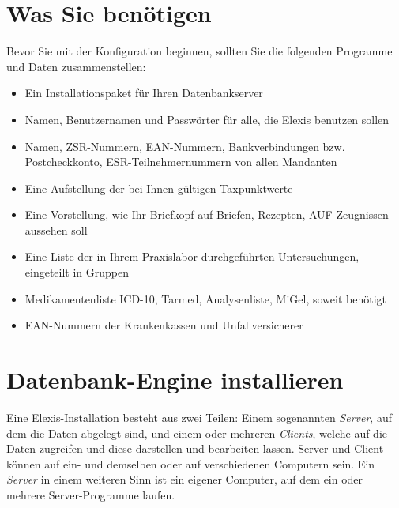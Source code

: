 \section{Was Sie benötigen}
Bevor Sie mit der Konfiguration beginnen, sollten Sie die folgenden Programme und Daten zusammenstellen:
\begin{itemize}
  \item Ein Installationspaket für Ihren Datenbankserver
  \item Namen, Benutzernamen und Passwörter für alle, die Elexis benutzen sollen
  \item Namen, ZSR-Nummern, EAN-Nummern, Bankverbindungen bzw. Postcheckkonto, ESR-Teilnehmernummern von allen Mandanten
  \item Eine Aufstellung der bei Ihnen gültigen Taxpunktwerte
  \item Eine Vorstellung, wie Ihr Briefkopf auf Briefen, Rezepten, AUF-Zeugnissen aussehen soll
  \item Eine Liste der in Ihrem Praxislabor durchgeführten Untersuchungen, eingeteilt in Gruppen
  \item Medikamentenliste ICD-10, Tarmed, Analysenliste, MiGel, soweit benötigt 
  \item EAN-Nummern der Krankenkassen und Unfallversicherer
\end{itemize} 

\section{Datenbank-Engine installieren}
\label{dbengine}
Eine Elexis-Installation besteht aus zwei Teilen: Einem sogenannten \textit{Server}, auf dem die Daten 
abgelegt sind, und einem oder mehreren \textit{Clients}, welche auf die Daten zugreifen und diese darstellen
und bearbeiten lassen. Server und Client können auf ein- und demselben oder auf verschiedenen Computern sein.
Ein \textit{\textit{Server}} in einem weiteren Sinn ist ein eigener Computer, auf dem ein oder mehrere
Server-Programme laufen.

